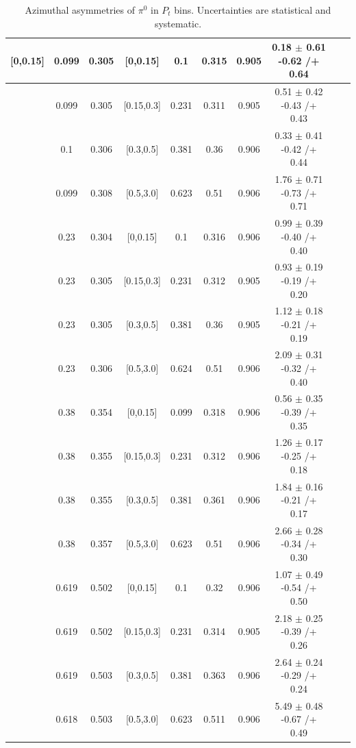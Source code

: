 \begin{table}[H]
\begin{tabular}{|c| c| c| c| c| c| c| c| c| c|}
[0,0.15]	&	0.099	&	0.305	&	[0,0.15]	&	0.1	        &	0.315	&	0.905	&	0.18	$\pm$	0.61	-0.62	/+	0.64	\\ \hline
[0,0.15]	&	0.099	&	0.305	&	[0.15,0.3]	&	0.231	&	0.311	&	0.905	&	0.51	$\pm$	0.42	-0.43	/+	0.43	\\ \hline
[0,0.15]	&	0.1	        &	0.306	&	[0.3,0.5]	&	0.381	&	0.36	        &	0.906	&	0.33	$\pm$	0.41	-0.42	/+	0.44	\\ \hline
[0,0.15]	&	0.099	&	0.308	&	[0.5,3.0]	&	0.623	&	0.51	        &	0.906	&	1.76	$\pm$	0.71	-0.73	/+	0.71	\\ \hline
[0.15,0.3]	&	0.23	        &	0.304	&	[0,0.15]	&	0.1	        &	0.316	&	0.906	&	0.99	$\pm$	0.39	-0.40	/+	0.40	\\ \hline
[0.15,0.3]	&	0.23	        &	0.305	&	[0.15,0.3]	&	0.231	&	0.312	&	0.905	&	0.93	$\pm$	0.19	-0.19	/+	0.20	\\ \hline
[0.15,0.3]	&	0.23	        &	0.305	&	[0.3,0.5]	&	0.381	&	0.36	        &	0.905	&	1.12	$\pm$	0.18	-0.21	/+	0.19	\\ \hline
[0.15,0.3]	&	0.23	        &	0.306	&	[0.5,3.0]	&	0.624	&	0.51	        &	0.906	&	2.09	$\pm$	0.31	-0.32	/+	0.40	\\ \hline
[0.3,0.5]	&	0.38	        &	0.354	&	[0,0.15]	&	0.099	&	0.318	&	0.906	&	0.56	$\pm$	0.35	-0.39	/+	0.35	\\ \hline
[0.3,0.5]	&	0.38	        &	0.355	&	[0.15,0.3]	&	0.231	&	0.312	&	0.906	&	1.26	$\pm$	0.17	-0.25	/+	0.18	\\ \hline
[0.3,0.5]	&	0.38	        &	0.355	&	[0.3,0.5]	&	0.381	&	0.361	&	0.906	&	1.84	$\pm$	0.16	-0.21	/+	0.17	\\ \hline
[0.3,0.5]	&	0.38	        &	0.357	&	[0.5,3.0]	&	0.623	&	0.51	        &	0.906	&	2.66	$\pm$	0.28	-0.34	/+	0.30	\\ \hline
[0.5,3.0]	&	0.619	&	0.502	&	[0,0.15]	&	0.1	        &	0.32	        &	0.906	&	1.07	$\pm$	0.49	-0.54	/+	0.50	\\ \hline
[0.5,3.0]	&	0.619	&	0.502	&	[0.15,0.3]	&	0.231	&	0.314	&	0.905	&	2.18	$\pm$	0.25	-0.39	/+	0.26	\\ \hline
[0.5,3.0]	&	0.619	&	0.503	&	[0.3,0.5]	&	0.381	&	0.363	&	0.906	&	2.64	$\pm$	0.24	-0.29	/+	0.24	\\ \hline
[0.5,3.0]	&	0.618	&	0.503	&	[0.5,3.0]	&	0.623	&	0.511	&	0.906	&	5.49	$\pm$	0.48	-0.67	/+	0.49	\\ \hline
\end{tabular}
\caption{Azimuthal asymmetries of $\pi^0$ in $P_t$ bins. Uncertainties are statistical and systematic.}
\label{tab:finalpi0ptbin}
\end{table}

